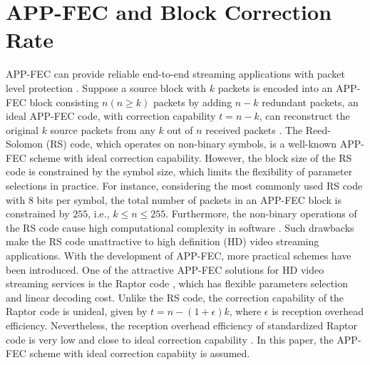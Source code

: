 \documentclass[journal]{IEEEtran}
\begin{document}
\section{APP-FEC and Block Correction Rate}
APP-FEC can provide reliable end-to-end streaming applications with packet level protection \cite{LuSW08}. Suppose a source block with $k$ packets is encoded into an APP-FEC block consisting $n \left(n\geq k\right)$ packets by adding $n-k$ redundant packets, an ideal APP-FEC code, with correction capability $t=n-k$, can reconstruct the original $k$ source packets from any $k$ out of $n$ received packets \cite{LuSW08}. The Reed-Solomon (RS) code, which operates on non-binary symbols, is a well-known APP-FEC scheme with ideal correction capability. However, the block size of the RS code is constrained by the symbol size, which limits the flexibility of parameter selections in practice. For instance, considering the most commonly used RS code with $8$ bits per symbol, the total number of packets in an APP-FEC block is constrained by $255$, i.e., $k\leq n \leq 255$. Furthermore, the non-binary operations of the RS code cause high computational complexity in software \cite{LuSW08}. Such drawbacks make the RS code unattractive to high definition (HD) video streaming applications. With the development of APP-FEC, more practical schemes have been introduced. One of the attractive APP-FEC solutions for HD video streaming services is the Raptor code \cite{ShAm06}, which has flexible parameters selection and linear decoding cost. Unlike the RS code, the correction capability of the Raptor code is unideal, given by $t=n-\left(1+\epsilon\right)k$, where $\epsilon$ is reception overhead efficiency. Nevertheless, the reception overhead efficiency of standardized Raptor code is very low and close to ideal correction capability \cite{LuSW08}. In this paper, the APP-FEC scheme with ideal correction capabiity is assumed.
\end{document}
